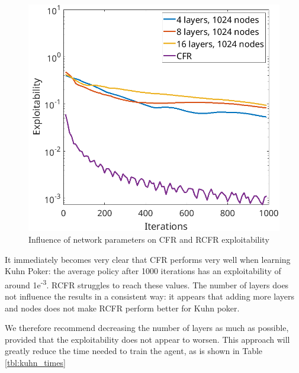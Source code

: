 \documentclass[10pt,a4paper]{article}
\begin{document}
\begin{figure}[h]
\includegraphics[scale=0.26]{Figures/rcfr_kuhn_parameters3.png}
\caption{Influence of network parameters on CFR and RCFR exploitability}
\label{fig:rcfr_kuhn}
\end{figure}
\FloatBarrier 

It immediately becomes very clear that CFR performs very well when learning Kuhn Poker: the average policy after 1000 iterations has an exploitability of around 1e\textsuperscript{-3}. RCFR struggles to reach these values. The number of layers does not influence the results in a consistent way: it appears that adding more layers and nodes does not make RCFR perform better for Kuhn poker. 

We therefore recommend decreasing the number of layers as much as possible, provided that the exploitability does not appear to worsen. This approach will greatly reduce the time needed to train the agent, as is shown in Table \ref{tbl:kuhn_times}
\end{document}
